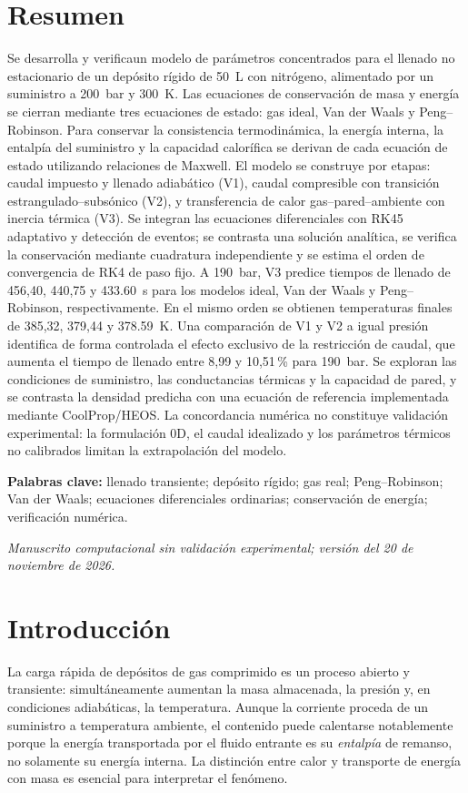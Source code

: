 \documentclass[11pt,letterpaper]{article}
\begin{document}
\section*{Resumen}
Se desarrolla y verificaun modelo de parámetros concentrados para el llenado no estacionario de un depósito rígido de \SI{50}{\liter} con nitrógeno, alimentado por un suministro a \SI{200}{bar} y \SI{300}{\kelvin}. Las ecuaciones de conservación de masa y energía se cierran mediante tres ecuaciones de estado: gas ideal, Van der Waals y Peng--Robinson. Para conservar la consistencia termodinámica, la energía interna, la entalpía del suministro y la capacidad calorífica se derivan de cada ecuación de estado utilizando relaciones de Maxwell. El modelo se construye por etapas: caudal impuesto y llenado adiabático (V1), caudal compresible con transición estrangulado--subsónico (V2), y transferencia de calor gas--pared--ambiente con inercia térmica (V3). Se integran las ecuaciones diferenciales con RK45 adaptativo y detección de eventos; se contrasta una solución analítica, se verifica la conservación mediante cuadratura independiente y se estima el orden de convergencia de RK4 de paso fijo. A \SI{190}{bar}, V3 predice tiempos de llenado de 456,40, 440,75 y \SI{433,60}{s} para los modelos ideal, Van der Waals y Peng--Robinson, respectivamente. En el mismo orden se obtienen temperaturas finales de 385,32, 379,44 y \SI{378,59}{K}. Una comparación de V1 y V2 a igual presión identifica de forma controlada el efecto exclusivo de la restricción de caudal, que aumenta el tiempo de llenado entre 8,99 y 10,51\,\% para \SI{190}{bar}. Se exploran las condiciones de suministro, las conductancias térmicas y la capacidad de pared, y se contrasta la densidad predicha con una ecuación de referencia implementada mediante CoolProp/HEOS. La concordancia numérica no constituye validación experimental: la formulación 0D, el caudal idealizado y los parámetros térmicos no calibrados limitan la extrapolación del modelo.

\noindent\textbf{Palabras clave:} llenado transiente; depósito rígido; gas real; Peng--Robinson; Van der Waals; ecuaciones diferenciales ordinarias; conservación de energía; verificación numérica.
\par\smallskip
{\footnotesize\textit{Manuscrito computacional sin validación experimental; versión del 20 de noviembre de 2026.}}
\par\medskip
\section{Introducción}
La carga rápida de depósitos de gas comprimido es un proceso abierto y transiente: simultáneamente aumentan la masa almacenada, la presión y, en condiciones adiabáticas, la temperatura. Aunque la corriente proceda de un suministro a temperatura ambiente, el contenido puede calentarse notablemente porque la energía transportada por el fluido entrante es su \emph{entalpía} de remanso, no solamente su energía interna. La distinción entre calor y transporte de energía con masa es esencial para interpretar el fenómeno.
\end{document}
